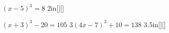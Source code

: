 

{
    $(x-5)^3  = 8$
}{2in}[\raggedleft{}][\raggedleft{}]




\myProblems
{
    $ (x+3)^3 -20  = 105 $
}
{
    $ 3(4x-7)^3+10 = 138$
}{3.5in}[\raggedleft{}][\raggedleft{}]





